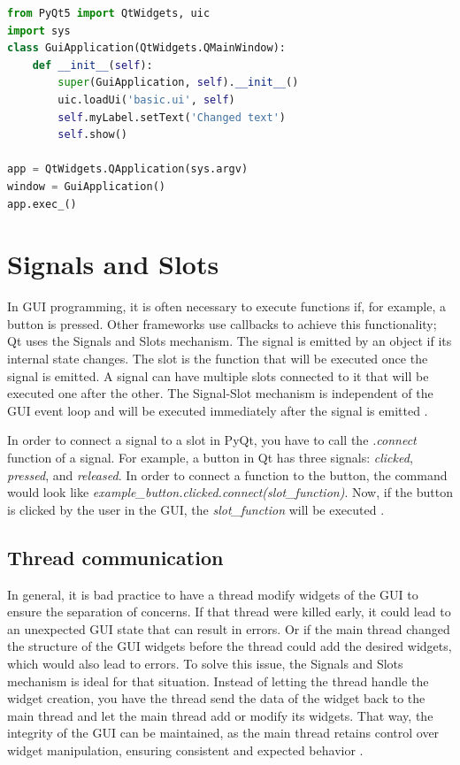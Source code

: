 \begin{lstlisting}[language=python, caption={Simple Qt GUI application}, label={lst:pyqt_gui}]
from PyQt5 import QtWidgets, uic
import sys
class GuiApplication(QtWidgets.QMainWindow):
    def __init__(self):
        super(GuiApplication, self).__init__()
        uic.loadUi('basic.ui', self)
        self.myLabel.setText('Changed text')
        self.show()

app = QtWidgets.QApplication(sys.argv)
window = GuiApplication()
app.exec_()
\end{lstlisting}

\section{Signals and Slots}
\label{sub:signals}

In GUI programming, it is often necessary to execute functions if, for example, a button is pressed. Other frameworks 
use callbacks to achieve this functionality; Qt uses the Signals and Slots mechanism. The signal is emitted by an 
object if its internal state changes. The slot is the function that will be executed once the signal is 
emitted. A signal can have multiple slots connected to it that will be executed one after the other. 
The Signal-Slot mechanism is independent of the GUI event loop and will be executed immediately after 
the signal is emitted \cite{qt}.

In order to connect a signal to a slot in PyQt, you have to call the \textit{.connect} function of a signal. 
For example, a button in Qt has three signals: \textit{clicked}, \textit{pressed}, and \textit{released}. 
In order to connect a function to the button, the command would look like \textit{example\_button.clicked.connect(slot\_function)}. 
Now, if the button is clicked by the user in the GUI, the \textit{slot\_function} will be executed \cite{pyqt}.

\subsection{Thread communication}
\label{sub:thread_communication}

In general, it is bad practice to have a thread modify widgets of the GUI to ensure the separation of concerns. 
If that thread were killed early, it could lead to an unexpected GUI state that can result in errors. Or if the 
main thread changed the structure of the GUI widgets before the thread could add the desired widgets, which would 
also lead to errors. To solve this issue, the Signals and Slots mechanism is ideal for that situation. Instead of 
letting the thread handle the widget creation, you have the thread send the data of the widget back to the main thread 
and let the main thread add or modify its widgets. That way, the integrity of the GUI can be maintained, as the 
main thread retains control over widget manipulation, ensuring consistent and expected behavior \cite{qt}.

